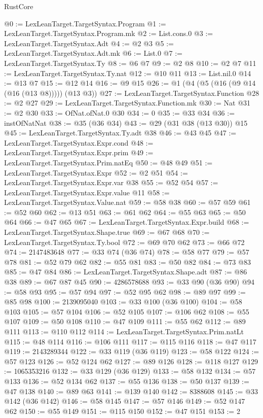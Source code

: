 \begin{lexlean}{RustCore}
\begin{coremodule}
@0 := LexLeanTarget.TargetSyntax.Program
@1 := LexLeanTarget.TargetSyntax.Program.mk
@2 := List.cons.{0}
@3 := LexLeanTarget.TargetSyntax.Adt
@4 := @2 @3
@5 := LexLeanTarget.TargetSyntax.Adt.mk
@6 := List.{0}
@7 := LexLeanTarget.TargetSyntax.Ty
@8 := @6 @7
@9 := @2 @8
@10 := @2 @7
@11 := LexLeanTarget.TargetSyntax.Ty.nat
@12 := @10 @11
@13 := List.nil.{0}
@14 := @13 @7
@15 := @12 @14
@16 := @9 @15
@26 := @1 (@4 (@5 (@16 (@9 @14 (@16 (@13 @8))))) (@13 @3))
@27 := LexLeanTarget.TargetSyntax.Function
@28 := @2 @27
@29 := LexLeanTarget.TargetSyntax.Function.mk
@30 := Nat
@31 := @2 @30
@33 := OfNat.ofNat.{0} @30
@34 := 0
@35 := @33 @34
@36 := instOfNatNat
@38 := @35 (@36 @34)
@43 := @29 (@31 @38 (@13 @30)) @15
@45 := LexLeanTarget.TargetSyntax.Ty.adt @38
@46 := @43 @45
@47 := LexLeanTarget.TargetSyntax.Expr.cond
@48 := LexLeanTarget.TargetSyntax.Expr.prim
@49 := LexLeanTarget.TargetSyntax.Prim.natEq
@50 := @48 @49
@51 := LexLeanTarget.TargetSyntax.Expr
@52 := @2 @51
@54 := LexLeanTarget.TargetSyntax.Expr.var @38
@55 := @52 @54
@57 := LexLeanTarget.TargetSyntax.Expr.value @11
@58 := LexLeanTarget.TargetSyntax.Value.nat
@59 := @58 @38
@60 := @57 @59
@61 := @52 @60
@62 := @13 @51
@63 := @61 @62
@64 := @55 @63
@65 := @50 @64
@66 := @47 @65
@67 := LexLeanTarget.TargetSyntax.Expr.build
@68 := LexLeanTarget.TargetSyntax.Shape.true
@69 := @67 @68
@70 := LexLeanTarget.TargetSyntax.Ty.bool
@72 := @69 @70 @62
@73 := @66 @72
@74 := 2147483648
@77 := @33 @74 (@36 @74)
@78 := @58 @77
@79 := @57 @78
@81 := @52 @79 @62
@82 := @55 @81
@83 := @50 @82
@84 := @73 @83
@85 := @47 @84
@86 := LexLeanTarget.TargetSyntax.Shape.adt
@87 := @86 @38
@89 := @67 @87 @45
@90 := 4286578688
@93 := @33 @90 (@36 @90)
@94 := @58 @93
@95 := @57 @94
@97 := @52 @95 @62
@98 := @89 @97
@99 := @85 @98
@100 := 2139095040
@103 := @33 @100 (@36 @100)
@104 := @58 @103
@105 := @57 @104
@106 := @52 @105
@107 := @106 @62
@108 := @55 @107
@109 := @50 @108
@110 := @47 @109
@111 := @55 @62
@112 := @89 @111
@113 := @110 @112
@114 := LexLeanTarget.TargetSyntax.Prim.natLt
@115 := @48 @114
@116 := @106 @111
@117 := @115 @116
@118 := @47 @117
@119 := 2143289344
@122 := @33 @119 (@36 @119)
@123 := @58 @122
@124 := @57 @123
@126 := @52 @124 @62
@127 := @89 @126
@128 := @118 @127
@129 := 1065353216
@132 := @33 @129 (@36 @129)
@133 := @58 @132
@134 := @57 @133
@136 := @52 @134 @62
@137 := @55 @136
@138 := @50 @137
@139 := @47 @138
@140 := @89 @63
@141 := @139 @140
@142 := 8388608
@145 := @33 @142 (@36 @142)
@146 := @58 @145
@147 := @57 @146
@149 := @52 @147 @62
@150 := @55 @149
@151 := @115 @150
@152 := @47 @151
@153 := 2

\end{coremodule}
\end{lexlean}
